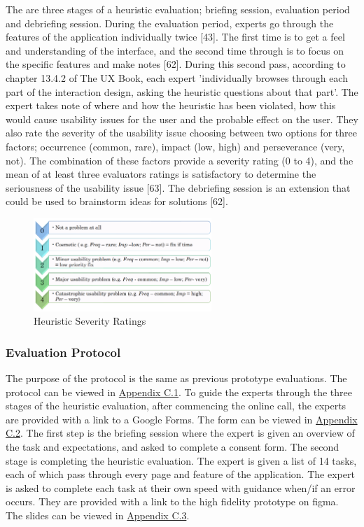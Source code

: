 \documentclass[a4 paper, 12pt]{article}
\begin{document}
    The are three stages of a heuristic evaluation; briefing session, evaluation period and debriefing session. During the evaluation period, experts go through the features of the application individually twice [43]. The first time is to get a feel and understanding of the interface, and the second time through is to focus on the specific features and make notes [62]. During this second pass, according to chapter 13.4.2 of The UX Book, each expert 'individually browses through each part of the interaction design, asking the heuristic questions about that part'. The expert takes note of where and how the heuristic has been violated, how this would cause usability issues for the user and the probable effect on the user. They also rate the severity of the usability issue choosing between two options for three factors; occurrence (common, rare), impact (low, high) and perseverance (very, not). The combination of these factors provide a severity rating (0 to 4), and the mean of at least three evaluators ratings is satisfactory to determine the seriousness of the usability issue [63]. The debriefing session is an extension that could be used to brainstorm ideas for solutions [62].
        \begin{figure} [H]
            \centering
            \includegraphics[width=0.6\textwidth, frame]
                {./High_Fidelity/High_Report/images/high_heuristic_severity.PNG}  
            \caption{Heuristic Severity Ratings}
        \end{figure} 

    
    \subsubsection{Evaluation Protocol}
    The purpose of the protocol is the same as previous prototype evaluations. The protocol can be viewed in \hyperref[sec:B.1]{Appendix C.1}. To guide the experts through the three stages of the heuristic evaluation, after commencing the online call, the experts are provided with a link to a Google Forms. The form can be viewed in \hyperref[sec:C.2]{Appendix C.2}. The first step is the briefing session where the expert is given an overview of the task and expectations, and asked to complete a consent form. The second stage is completing the heuristic evaluation. The expert is given a list of 14 tasks, each of which pass through every page and feature of the application. The expert is asked to complete each task at their own speed with guidance when/if an error occurs.  They are provided with a link to the high fidelity prototype on figma. The slides can be viewed in \hyperref[sec:C.3]{Appendix C.3}.
        
\end{document}
